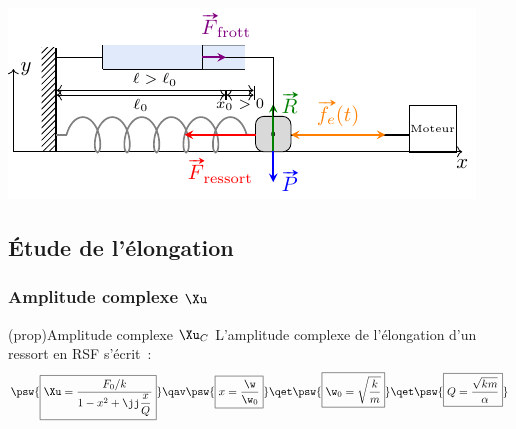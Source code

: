 \documentclass[../../main/main.tex]{subfiles}
\begin{document}
\begin{tcb}
\begin{isd}[righthand ratio=.45]
\begin{center}
{			}{
				\includegraphics[width=\linewidth]{ressort-horiz}
			}
			\vspace{-15pt}
		\end{center}
	\end{isd}
\end{tcb}

\subsection{Étude de l'élongation}
\subsubsection{Amplitude complexe $\Xu$}

\begin{tcb}(prop){Amplitude complexe $\Xu_C$}
	L'amplitude complexe de l'élongation d'un ressort en RSF s'écrit~:
	\[
		\psw{%
			\boxed{
				\Xu =
				\frac{F_0/k}{1 - x ^2 + \jj\dfrac{x}{Q}}
			}
		}%
		\qav
		\psw{\boxed{x = \frac{\w}{\w_0}}}
		\qet
		\psw{\boxed{\w_0 = \sqrt{\frac{k}{m}}}}
		\qet
		\psw{\boxed{Q = \frac{\sqrt{km}}{\alpha}}}
	\]
\end{tcb}
\end{document}
